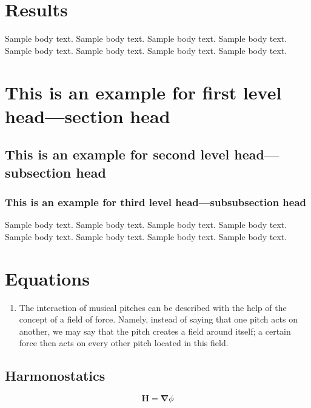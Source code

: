 \documentclass[sn-mathphys]{sn-jnl}%
\begin{document}
\section{Results}\label{sec2}

Sample body text. Sample body text. Sample body text. Sample body text. Sample body text. Sample body text. Sample body text. Sample body text.

\section{This is an example for first level head---section head}\label{sec3}

\subsection{This is an example for second level head---subsection head}\label{subsec2}

\subsubsection{This is an example for third level head---subsubsection head}\label{subsubsec2}

Sample body text. Sample body text. Sample body text. Sample body text. Sample body text. Sample body text. Sample body text. Sample body text. 

\section{Equations}\label{sec4}

\begin{enumerate}
\item The interaction of musical pitches can be described with the help of the concept of a field of force. Namely, instead of saying that one pitch acts on another, we may say that the pitch creates a field around itself; a certain force then acts on every other pitch located in this field.
\end{enumerate}

\subsection{Harmonostatics}

\begin{equation}
  \boldsymbol{H} = \boldsymbol{\nabla}\phi\label{gradPhiEq}
\end{equation}
\end{document}
